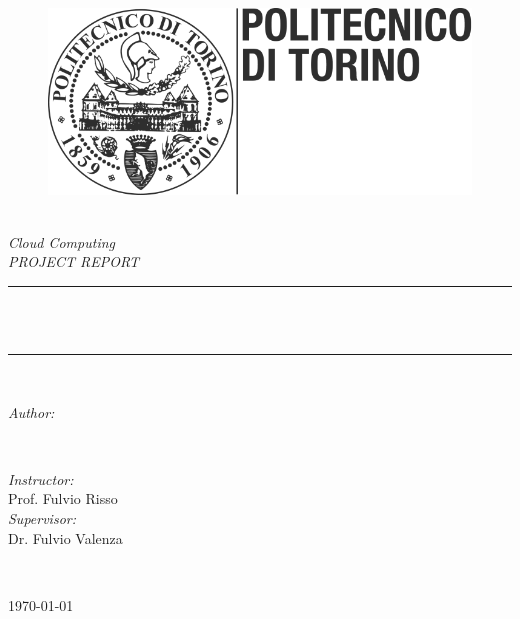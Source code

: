 \begin{titlepage}
\newcommand{\HRule}{\rule{\linewidth}{0.5mm}}
\begin{figure}[!htb]
     \centering
     \includegraphics[width=.3\linewidth]{title/polito_logo.png}
\end{figure}

\center 
\quad\\[1.5cm]

\textsl{\Large Cloud Computing}\\[1.5cm] 
\textsl{\large PROJECT REPORT}\\[1.5cm] 
\makeatletter
\HRule \\[0.5cm]
{ \huge \bfseries \@title}\\[0.5cm] 
\HRule \\[1.5cm]
\begin{minipage}{0.4\textwidth}
\begin{flushleft} \large
\emph{Author:}\\
\@author 
\end{flushleft}
\end{minipage}
~
\begin{minipage}{0.4\textwidth}
\begin{flushright} \large
\emph{Instructor:} \\
\textup{Prof. Fulvio Risso} \\
\vspace{1cm}
\emph{Supervisor:} \\
\textup{Dr. Fulvio Valenza}
\end{flushright}
\end{minipage}\\[3cm]
\makeatother
\vspace{4cm}

{\large \today}\\[2cm] 
\vfill 
\end{titlepage}